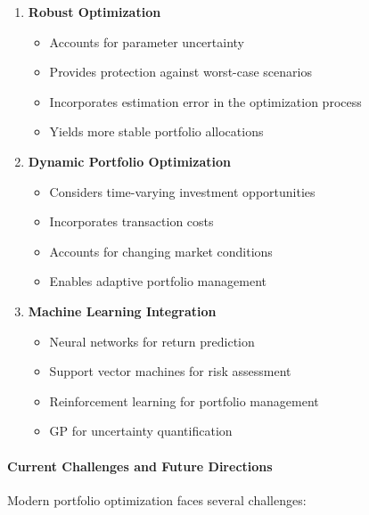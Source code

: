 \begin{enumerate}
    \item \textbf{Robust Optimization}
    \begin{itemize}
        \item Accounts for parameter uncertainty
        \item Provides protection against worst-case scenarios
        \item Incorporates estimation error in the optimization process
        \item Yields more stable portfolio allocations
    \end{itemize}

    \item \textbf{Dynamic Portfolio Optimization}
    \begin{itemize}
        \item Considers time-varying investment opportunities
        \item Incorporates transaction costs
        \item Accounts for changing market conditions
        \item Enables adaptive portfolio management
    \end{itemize}

    \item \textbf{Machine Learning Integration}
    \begin{itemize}
        \item Neural networks for return prediction \parencite{heaton2017deep}
        \item Support vector machines for risk assessment
        \item Reinforcement learning for portfolio management
        \item \ac{GP} for uncertainty quantification
    \end{itemize}
\end{enumerate}

\paragraph{Current Challenges and Future Directions}
Modern portfolio optimization faces several challenges:

